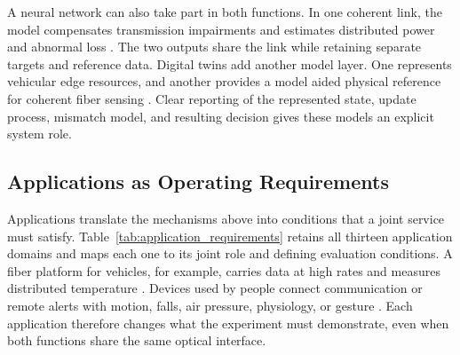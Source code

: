 A neural network can also take part in both functions. In one coherent link,
the model compensates transmission impairments and estimates distributed power
and abnormal loss \cite{OISAC_SCR00949}. The two outputs share the link while
retaining separate targets and reference data. Digital twins add another model
layer. One represents vehicular edge resources, and another provides a model
aided physical reference for coherent fiber sensing
\cite{OISAC_SCR01059,OISAC_SCR01185}. Clear reporting of the represented state,
update process, mismatch model, and resulting decision gives these models an
explicit system role.

\subsection{Applications as Operating Requirements}

Applications translate the mechanisms above into conditions that a joint
service must satisfy. Table~\ref{tab:application_requirements} retains all
thirteen application domains and maps each one to its joint role and defining
evaluation conditions. A fiber platform for vehicles, for
example, carries data at high rates and measures distributed temperature
\cite{OISAC_SCR00123}. Devices used by people connect communication or remote
alerts with motion, falls, air pressure, physiology, or gesture
\cite{OISAC_SCR00451,OISAC_SCR00294,OISAC_SCR00376}. Each application therefore
changes what the experiment must demonstrate, even when both functions share
the same optical interface.

